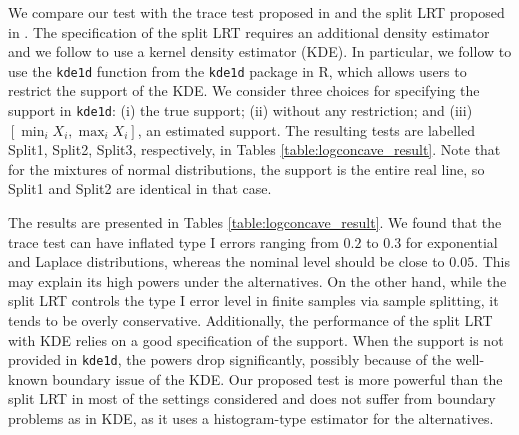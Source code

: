 \documentclass[12pt,letterpaper, twoside, openany]{article}
\theoremstyle{plain}
\begin{document}
We compare our test with the trace test proposed in \cite{chen2013smoothed} and the split LRT proposed in \cite{dunn2021universal}. 
 The specification of the split LRT requires an additional density estimator and we follow \cite{dunn2021universal} to use a kernel density estimator (KDE). In particular, we follow \cite{dunn2021universal} to use the \verb|kde1d| function from the \verb|kde1d| package in R, which allows users to restrict the support of the KDE. 
  We consider three choices for specifying the support in \verb|kde1d|: (i) the true support; (ii) without any restriction; and (iii) $[\min_i X_i, \max_i X_i]$, an estimated support. The resulting tests are labelled Split1, Split2, Split3, respectively, in Tables \ref{table:logconcave_result}. Note that for the mixtures of normal distributions, the support is the entire real line, so Split1 and Split2 are identical in that case.

The results are presented in Tables \ref{table:logconcave_result}. We found that the trace test can have inflated type I errors ranging from $0.2$ to $0.3$ for exponential and Laplace distributions, whereas the nominal level should be close to $0.05$. This may explain its high powers under the alternatives. On the other hand, while the split LRT controls the type I error level in finite samples via sample splitting, it tends to be overly conservative. Additionally, the performance of the split LRT with KDE relies on a good specification of the support. When the support is not provided in \verb|kde1d|, the powers drop significantly, possibly because of the well-known boundary issue of the KDE. Our proposed test is more powerful than the split LRT in most of the settings considered and does not suffer from boundary problems as in KDE, as it uses a histogram-type estimator for the alternatives. 
\end{document}
